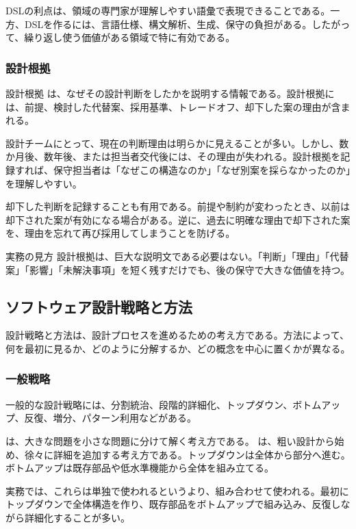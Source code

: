 \documentclass[a4paper,11pt]{ltjsarticle}
\numberwithin{figure}{section}
\numberwithin{table}{section}
\begin{document}
DSLの利点は、領域の専門家が理解しやすい語彙で表現できることである。一方、DSLを作るには、言語仕様、構文解析、生成、保守の負担がある。したがって、繰り返し使う価値がある領域で特に有効である。

\subsubsection{設計根拠}

設計根拠 は、なぜその設計判断をしたかを説明する情報である。設計根拠には、前提、検討した代替案、採用基準、トレードオフ、却下した案の理由が含まれる。

設計チームにとって、現在の判断理由は明らかに見えることが多い。しかし、数か月後、数年後、または担当者交代後には、その理由が失われる。設計根拠を記録すれば、保守担当者は「なぜこの構造なのか」「なぜ別案を採らなかったのか」を理解しやすい。

却下した判断を記録することも有用である。前提や制約が変わったとき、以前は却下された案が有効になる場合がある。逆に、過去に明確な理由で却下された案を、理由を忘れて再び採用してしまうことを防げる。

\begin{pointbox}{実務の見方}
設計根拠は、巨大な説明文である必要はない。「判断」「理由」「代替案」「影響」「未解決事項」を短く残すだけでも、後の保守で大きな価値を持つ。
\end{pointbox}

\subsection{ソフトウェア設計戦略と方法}

設計戦略と方法は、設計プロセスを進めるための考え方である。方法によって、何を最初に見るか、どのように分解するか、どの概念を中心に置くかが異なる。

\subsubsection{一般戦略}

一般的な設計戦略には、分割統治、段階的詳細化、トップダウン、ボトムアップ、反復、増分、パターン利用などがある。

 は、大きな問題を小さな問題に分けて解く考え方である。 は、粗い設計から始め、徐々に詳細を追加する考え方である。トップダウンは全体から部分へ進む。ボトムアップは既存部品や低水準機能から全体を組み立てる。

実務では、これらは単独で使われるというより、組み合わせて使われる。最初にトップダウンで全体構造を作り、既存部品をボトムアップで組み込み、反復しながら詳細化することが多い。
\end{document}
